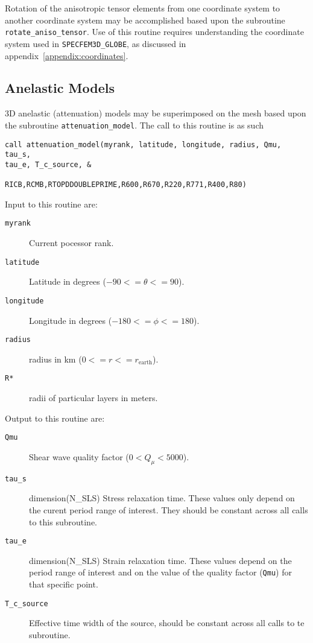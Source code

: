 \documentclass[onecolumn]{article}
\begin{document}
Rotation of the anisotropic tensor elements from one coordinate
system to another
coordinate system may be accomplished based upon the subroutine
\texttt{rotate\_aniso\_tensor}.
Use of this routine requires understanding the coordinate
system used in \texttt{SPECFEM3D\_GLOBE},
as discussed in appendix~\ref{appendix:coordinates}.

%
\subsection{Anelastic Models}

3D anelastic (attenuation) models may be superimposed on the mesh based 
upon the subroutine
\texttt{attenuation\_model}.  The call to this routine is as such
\begin{verbatim}
call attenuation_model(myrank, latitude, longitude, radius, Qmu, tau_s, 
tau_e, T_c_source, &
 
RICB,RCMB,RTOPDDOUBLEPRIME,R600,R670,R220,R771,R400,R80)
\end{verbatim}
Input to this routine are:
\begin{description}
\item[\texttt{myrank}] Current pocessor rank.
\item[\texttt{latitude}] Latitude in degrees ($ -90 <= \theta <= 90$).
\item[\texttt{longitude}] Longitude in degrees ($-180 <= \phi <= 180 $).
\item[\texttt{radius}] radius in km ($ 0 <= r <= r_\mathrm{earth}$).
\item[\texttt{R*}] radii of particular layers in meters.
\end{description}
Output to this routine are:
\begin{description}
\item[\texttt{Qmu}] Shear wave quality factor ($ 0 < Q_\mu < 5000 $).
\item[\texttt{tau\_s}] dimension(N\_SLS) Stress relaxation time.  These 
values only depend on the
curent period range of interest.  They should be constant across all 
calls to this subroutine.
\item[\texttt{tau\_e}] dimension(N\_SLS) Strain relaxation time.  These 
values depend on the period
range of interest and on the value of the quality factor (\texttt{Qmu}) for that 
specific point.
\item[\texttt{T\_c\_source}] Effective time width of the source, should 
be constant across all calls
to te subroutine.
\end{description}
\end{document}
